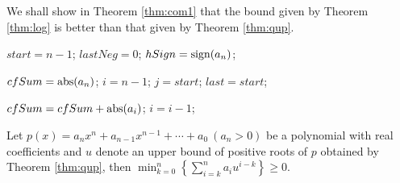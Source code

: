 

We shall show in Theorem \ref{thm:com1} that the bound given by Theorem \ref{thm:log} is better than that given by Theorem \ref{thm:qup}.








\begin{algorithm}
\caption{\less \label{alg:less}}
\DontPrintSemicolon
{}

$start=n-1$;\;
$lastNeg=0$;\;
$hSign={\rm sign}(a_n)$;\;


$cfSum={\rm abs}(a_n)$;
$i=n-1$;
$j=start$;
$last=start$;\;
{
	{

	 $cfSum=cfSum+{\rm abs}(a_i)$;
	 $i=i-1$;\;

	}
}

\end{algorithm}

\begin{theorem}\label{thm:com}
	Let $p(x)=a_nx^n+a_{n-1}x^{n-1}+\cdots+a_0\ (a_n>0)$ be a polynomial with real coefficients and   $u$ denote an upper bound of positive roots of $p$ obtained by Theorem \ref{thm:qup}, then $\min_{k=0}^{n}\left\{  \sum_{i=k}^n a_i u^{i-k}\right\}\ge0$.
	
\end{theorem}

